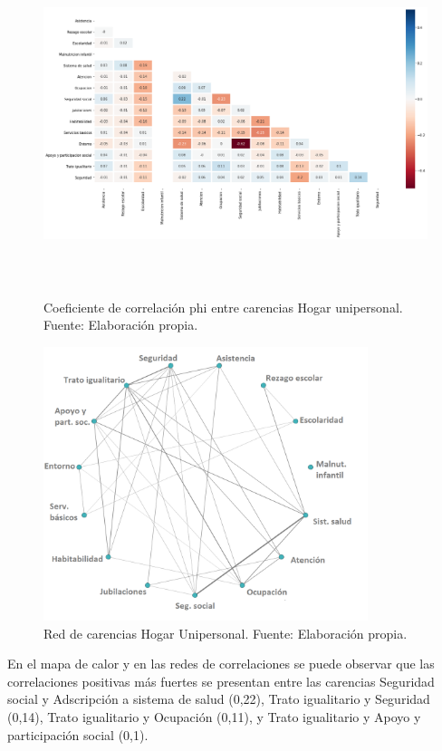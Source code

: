 \documentclass[12pt,letterpaper,spanish]{article}
\begin{document}
\begin{figure}[H]
    \centering
        \includegraphics[height=10cm]{Heatmaps/Heatmap_pearson_car_unip.png}
    \caption{Coeficiente de correlación phi entre carencias Hogar unipersonal. Fuente: Elaboración propia.}
    \label{HMUni}
\end{figure}
\begin{figure}[H]
  \centering
    \includegraphics[height=8cm]{Grafos/grafo_unipersonal_pos.png}
    \caption{Red de carencias Hogar Unipersonal. Fuente: Elaboración propia.}
    \label{RedUnipos}
\end{figure}

En el mapa de calor y en las redes de correlaciones se puede observar que las correlaciones positivas más fuertes se presentan entre las carencias Seguridad social y Adscripción a sistema de salud (0,22), Trato igualitario y Seguridad (0,14), Trato igualitario y Ocupación (0,11), y Trato igualitario y Apoyo y participación social (0,1). 
\end{document}
